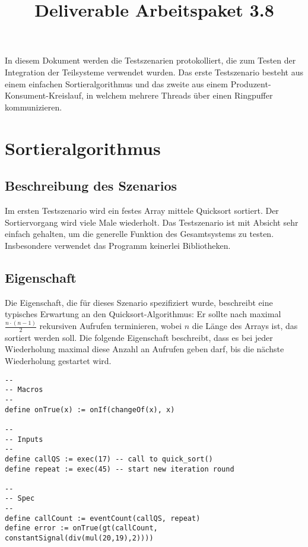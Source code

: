 \documentclass{article}
\title{Deliverable Arbeitspaket 3.8}
\title{\thetitle}
\begin{document}
\maketitle

In diesem Dokument werden die Testszenarien protokolliert, die zum Testen der Integration der Teilsysteme verwendet wurden. Das erste Testszenario besteht aus einem einfachen Sortieralgorithmus und das zweite aus einem Produzent-Konsument-Kreislauf, in welchem mehrere Threads über einen Ringpuffer kommunizieren.

\section{Sortieralgorithmus}

\subsection{Beschreibung des Szenarios}

Im ersten Testszenario wird ein festes Array mittele Quicksort sortiert. Der Sortiervorgang wird viele Male wiederholt. Das Testszenario ist mit Absicht sehr einfach gehalten, um die generelle Funktion des Gesamtsystems zu testen.
Insbesondere verwendet das Programm keinerlei Bibliotheken.

\subsection{Eigenschaft}

Die Eigenschaft, die für dieses Szenario spezifiziert wurde, beschreibt eine typisches Erwartung an den Quicksort-Algorithmus: Er sollte nach maximal $\frac{n \cdot (n - 1)}{2}$ rekursiven Aufrufen terminieren, wobei $n$ die Länge des Arrays ist, das sortiert werden soll. Die folgende Eigenschaft beschreibt, dass es bei jeder Wiederholung maximal diese Anzahl an Aufrufen geben darf, bis die nächste Wiederholung gestartet wird.

\begin{lstlisting}[language=tessla+salt]
--
-- Macros
--
define onTrue(x) := onIf(changeOf(x), x)

--
-- Inputs
--
define callQS := exec(17) -- call to quick_sort()
define repeat := exec(45) -- start new iteration round

--
-- Spec
--
define callCount := eventCount(callQS, repeat)
define error := onTrue(gt(callCount, constantSignal(div(mul(20,19),2))))
\end{lstlisting}
\end{document}
